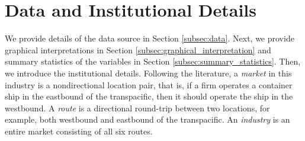 \documentclass[11pt]{article}
\begin{document}
\section{Data and Institutional Details}\label{sec:data}

We provide details of the data source in Section \ref{subsec:data}. Next, we provide graphical interpretations in Section \ref{subsec:graphical_interpretation} and summary statistics of the variables in Section \ref{subsec:summary_statistics}. Then, we introduce the institutional details. Following the literature, a \textit{market} in this industry is a nondirectional location pair, that is, if a firm operates a container ship in the eastbound of the transpacific, then it should operate the ship in the westbound. A \textit{route} is a directional round-trip between two locations, for example, both westbound and eastbound of the transpacific. An \textit{industry} is an entire market consisting of all six routes.
\end{document}
